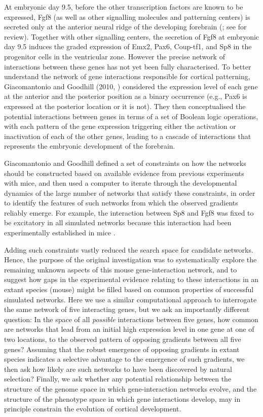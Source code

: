 \documentclass[10pt,letterpaper]{article}
\begin{document}
At embryonic day 9.5, before the other transcription factors are known to be expressed, Fgf8 (as well as other signalling molecules and patterning centers) is secreted only at the anterior neural ridge of the developing forebrain (\cite{Rakic2009}; see \cite{Greig2013} for review). Together with other signalling centers, the secretion of Fgf8 at embryonic day 9.5 induces the graded expression of Emx2, Pax6, Coup-tf1, and Sp8 in the progenitor cells in the ventricular zone. However the precise network of interactions between these genes has not yet been fully characterised. To better understand the network of gene interactions responsible for cortical patterning, Giacomantonio and Goodhill (2010, \cite{Giacomantonio2010}) considered the expression level of each gene at the anterior and the posterior position as a binary occurrence (e.g., Pax6 is expressed at the posterior location or it is not). They then conceptualised the potential interactions between genes in terms of a set of Boolean logic operations, with each pattern of the gene expression triggering either the activation or inactivation of each of the other genes, leading to a cascade of interactions that represents the embryonic development of the forebrain. 

Giacomantonio and Goodhill defined a set of constraints on how the networks should be constructed based on available evidence from previous experiments with mice, and then used a computer to iterate through the developmental dynamics of the large number of networks that satisfy these constraints, in order to identify the features of such networks from which the observed gradients reliably emerge. For example, the interaction between Sp8 and Fgf8 was fixed to be excitatory in all simulated networks because this interaction had been experimentally established in mice \cite{Sahara2007}. 

Adding such constraints vastly reduced the search space for candidate networks. Hence, the purpose of the original investigation was to systematically explore the remaining unknown aspects of this mouse gene-interaction network, and to suggest how gaps in the experimental evidence relating to these interactions in an extant species (mouse) might be filled based on  common properties of successful simulated networks. Here we use a similar computational approach to interrogate the same network of five interacting genes, but we ask an importantly different question: In the space of all \emph{possible} interactions between five genes, how common are networks that lead from an initial high expression level in one gene at one of two locations, to the observed pattern of opposing gradients between all five genes? Assuming that the robust emergence of opposing gradients in extant species indicates a selective advantage to the emergence of such gradients, we then ask how likely are such networks to have been discovered by natural selection? Finally, we ask whether any potential relationship between the structure of the genome space in which gene-interaction networks evolve, and the structure of the phenotype space in which gene interactions develop, may in principle constrain the evolution of cortical development. 
\end{document}
